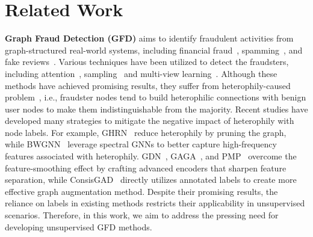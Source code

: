 \section{Related Work}
\noindent \textbf{Graph Fraud Detection (GFD)} aims to identify fraudulent activities from graph-structured real-world systems, including financial fraud~\cite{motie2023financial}, spamming~\cite{deng2022markov}, and fake reviews~\cite{yu2022graph}. Various techniques have been utilized to detect the fraudsters, including attention~\cite{liu2020alleviating}, sampling~\cite{liu2021pick, liu2021pick} and multi-view learning~\cite{zhong2020financial}. 
Although these methods have achieved promising results, they suffer from heterophily-caused problem~\cite{dou2020enhancing}, i.e., fraudster nodes tend to build heterophilic connections with benign user nodes to make them indistinguishable from the majority.
Recent studies have developed many strategies to mitigate the negative impact of heterophily with node labels.
For example, GHRN~\cite{gao2023addressing} reduce heterophily by pruning the graph, while BWGNN~\cite{tang2022rethinking} leverage spectral GNNs to better capture high-frequency features associated with heterophily. GDN~\cite{gao2023alleviating}, GAGA~\cite{wang2023label}, and PMP~\cite{zhuo2024partitioning} overcome the feature-smoothing effect by crafting advanced encoders that sharpen feature separation, while ConsisGAD~\cite{chen2024consistency} directly utilizes annotated labels to create more effective graph augmentation method. 
Despite their promising results, the reliance on labels in existing methods restricts their applicability in unsupervised scenarios. Therefore, in this work, we aim to address the pressing need for developing unsupervised GFD methods.




